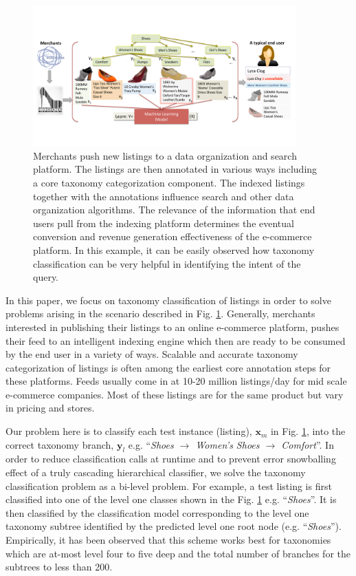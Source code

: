 \begin{figure}[ht]
	\centering
	\includegraphics[width=0.9\textwidth]{images/push-pull}
	\vspace{-0.2cm}
	\caption{{\small Merchants push new listings to a data organization and search platform. The listings are then annotated in various ways including a core taxonomy categorization component. The indexed listings together with the annotations influence search and other data organization algorithms. The relevance of the information that end users pull from the indexing platform determines the eventual conversion and revenue generation effectiveness of the e-commerce platform. In this example, it can be easily observed how taxonomy classification can be very helpful in identifying the intent of the query.}}
	\label{Fig:push-pull}
\end{figure}
\vspace{-0.5cm}

In this paper, we focus on taxonomy classification of listings in order to solve problems arising in the scenario described in Fig. \ref{Fig:push-pull}.
Generally, merchants interested in publishing their listings to an online e-commerce platform, pushes their feed to an intelligent indexing engine which then are ready to be consumed by the end user in a variety of ways.
Scalable and accurate taxonomy categorization of listings is often among the earliest core annotation steps for these platforms.
Feeds usually come in at 10-20 million listings/day for mid scale e-commerce companies.
Most of these listings are for the same product but vary in pricing and stores.

Our problem here is to classify each test instance (listing), $\mathbf{x}_m$ in Fig. \ref{Fig:push-pull}, into the correct taxonomy branch, $\mathbf{y}_l$ e.g. ``\textit{Shoes $\rightarrow$ Women's Shoes $\rightarrow$ Comfort}''.
In order to reduce classification calls at runtime and to prevent error snowballing effect of a truly cascading hierarchical classifier, we solve the taxonomy classification problem as a bi-level problem.
For example, a test listing is first classified into one of the level one classes shown in the Fig. \ref{Fig:push-pull} e.g. ``\textit{Shoes}''.
It is then classified by the classification model corresponding to the level one taxonomy subtree identified by the predicted level one root node (e.g. ``\textit{Shoes}'').
Empirically, it has been observed that this scheme works best for taxonomies which are at-most level four to five deep and the total number of branches for the subtrees to less than 200. 

